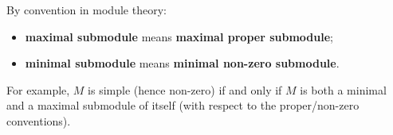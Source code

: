 By convention in module theory:
\begin{itemize}
\item \textbf{maximal submodule} means \textbf{maximal proper submodule};
\item \textbf{minimal submodule} means \textbf{minimal non-zero submodule}.
\end{itemize}

For example, $M$ is simple (hence non-zero) if and only if $M$ is both a minimal and a maximal submodule of itself (with respect to the proper/non-zero conventions).
